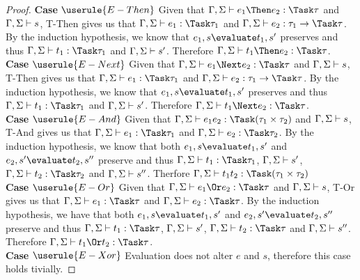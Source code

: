 \begin{proof}
  \noindent\textbf{Case} $\userule{E-Then}$
      Given that $\Gamma,\Sigma\infers e_1\Then e_2:\Task \tau$ and $\Gamma,\Sigma\vdash s$, T-Then gives us that $\Gamma,\Sigma\infers e_1:\Task\tau_1$
      and $\Gamma,\Sigma\infers e_2:\tau_1 \to \Task \tau$. By the induction hypothesis, we know that
      $e_1,s\evaluate t_1,s'$ preserves and thus $\Gamma,\Sigma\infers t_1:\Task\tau_1$ and $\Gamma,\Sigma\vdash s'$. Therefore
      $\Gamma,\Sigma\infers t_1\Then e_2:\Task\tau$.\\

  \noindent\textbf{Case} $\userule{E-Next}$
      Given that $\Gamma,\Sigma\infers e_1\Next e_2:\Task \tau$ and $\Gamma,\Sigma\vdash s$, T-Then gives us that $\Gamma,\Sigma\infers e_1:\Task\tau_1$
      and $\Gamma,\Sigma\infers e_2:\tau_1 \to \Task \tau$. By the induction hypothesis, we know that
      $e_1,s\evaluate t_1,s'$ preserves and thus $\Gamma,\Sigma\infers t_1:\Task\tau_1$ and $\Gamma,\Sigma\vdash s'$. Therefore
      $\Gamma,\Sigma\infers t_1\Next e_2:\Task\tau$.\\

  \noindent\textbf{Case} $\userule{E-And}$
      Given that $\Gamma,\Sigma\infers e_1\And e_2:\Task(\tau_1\times\tau_2)$ and $\Gamma,\Sigma\vdash s$, T-And gives us that
      $\Gamma,\Sigma\infers e_1:\Task\tau_1$ and $\Gamma,\Sigma\infers e_2:\Task\tau_2$. By the induction hypothesis, we
      know that both $e_1,s\evaluate t_1,s'$ and $e_2,s'\evaluate t_2,s''$ preserve and thus
      $\Gamma,\Sigma\infers t_1:\Task\tau_1$, $\Gamma,\Sigma\vdash s'$, $\Gamma,\Sigma\infers t_2:\Task\tau_2$ and $\Gamma,\Sigma\vdash s''$. Therfore
      $\Gamma,\Sigma\infers t_1\And t_2:\Task(\tau_1\times\tau_2)$\\

  \noindent\textbf{Case} $\userule{E-Or}$
      Given that $\Gamma,\Sigma\infers e_1\Or e_2:\Task\tau$ and $\Gamma,\Sigma\vdash s$, T-Or gives us that $\Gamma,\Sigma\infers e_1:\Task\tau$ and
      $\Gamma,\Sigma\infers e_2:\Task\tau$. By the induction hypothesis, we have that both
      $e_1,s\evaluate t_1,s'$ and $e_2,s'\evaluate t_2,s''$ preserve and thus $\Gamma,\Sigma\infers t_1:\Task\tau$, $\Gamma,\Sigma\vdash s'$,
      $\Gamma,\Sigma\infers t_2:\Task\tau$ and $\Gamma,\Sigma\vdash s''$. Therefore $\Gamma,\Sigma\infers t_1\Or t_2:\Task\tau$.\\

  \noindent\textbf{Case} $\userule{E-Xor}$
      Evaluation does not alter $e$ and $s$, therefore this case holds tivially.
\end{proof}




